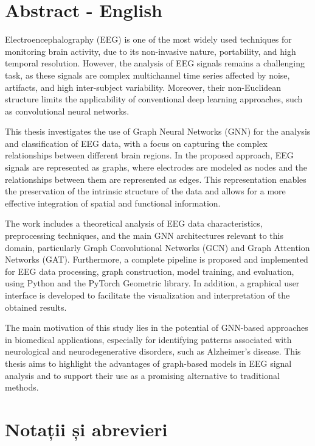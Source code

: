 \documentclass[12pt,a4paper]{report}
\theoremstyle{definition}
\theoremstyle{remark}
\begin{document}
\section*{Abstract - English}

Electroencephalography (EEG) is one of the most widely used techniques for monitoring brain activity, due to its non-invasive nature, portability, and high temporal resolution. However, the analysis of EEG signals remains a challenging task, as these signals are complex multichannel time series affected by noise, artifacts, and high inter-subject variability. Moreover, their non-Euclidean structure limits the applicability of conventional deep learning approaches, such as convolutional neural networks.

This thesis investigates the use of Graph Neural Networks (GNN) for the analysis and classification of EEG data, with a focus on capturing the complex relationships between different brain regions. In the proposed approach, EEG signals are represented as graphs, where electrodes are modeled as nodes and the relationships between them are represented as edges. This representation enables the preservation of the intrinsic structure of the data and allows for a more effective integration of spatial and functional information.

The work includes a theoretical analysis of EEG data characteristics, preprocessing techniques, and the main GNN architectures relevant to this domain, particularly Graph Convolutional Networks (GCN) and Graph Attention Networks (GAT). Furthermore, a complete pipeline is proposed and implemented for EEG data processing, graph construction, model training, and evaluation, using Python and the PyTorch Geometric library. In addition, a graphical user interface is developed to facilitate the visualization and interpretation of the obtained results.

The main motivation of this study lies in the potential of GNN-based approaches in biomedical applications, especially for identifying patterns associated with neurological and neurodegenerative disorders, such as Alzheimer's disease. This thesis aims to highlight the advantages of graph-based models in EEG signal analysis and to support their use as a promising alternative to traditional methods.

\newpage

\section*{Notații și abrevieri}
\end{document}
